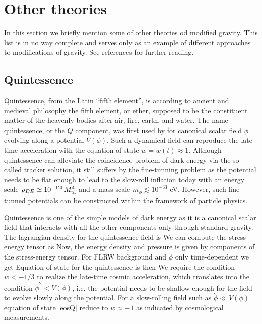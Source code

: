 \section{Other theories}
In this section we briefly mention some of other theories od modified gravity. This list is in no way complete and serves only as an example of different approaches to modifications of gravity. See references for further reading.
\subsection{Quintessence}
Quintessence, from the Latin ``fifth element'', is according to ancient and medieval philosophy the fifth element, or ether, supposed to be the constituent matter of the heavenly bodies after air, fire, earth, and water. The name quintessence, or the $Q$ component, was first used by \textcite{1998PhRvL..80.1582C} for canonical scalar field $\phi$ evolving along a potential $V(\phi)$. Such a dynamical field can reproduce the late-time acceleration with the equation of state $w=w(t)\approx1$. Although quintessence can alleviate the coincidence problem of dark energy via the so-called tracker solution, it still suffers by the fine-tunning problem as the potential needs to be flat enough to lead to the slow-roll inflation today with an energy scale $\rho_{DE}\simeq10^{-120}M_{\text{\scriptsize pl}}^4$ and a mass scale $m_\phi\lesssim10^{-33}$ eV. However, such fine-tunned potentials can be constructed within the framework of particle physics.

Quintessence is one of the simple models of dark energy as it is a canonical scalar field that interacts with all the other components only through standard gravity. The lagrangian density for the quintessence field is
We can compute the stress-energy tensor as
Now, the energy density and pressure is given by components of the stress-energy tensor. For FLRW background and $\phi$ only time-dependent we get
Equation of state for the quintessence is then
We require the condition $w<-1/3$ to realize the late-time cosmic acceleration, which translates into the condition  $\dot{\phi}^2<V(\phi)$, i.e. the potential needs to be shallow enough for the field to evolve slowly along the potential. For a slow-rolling field such as $\dot{\phi}\ll V(\phi)$ equation of state \eqref{eosQ} reduce to $w\approx-1$ as indicated by cosmological measurements.

